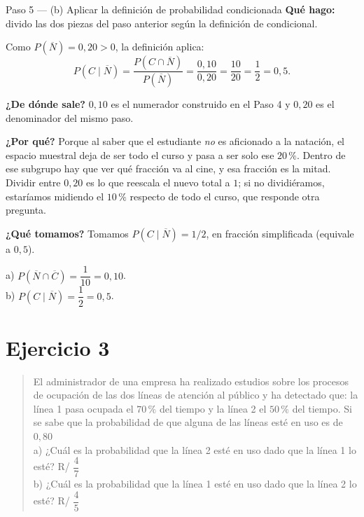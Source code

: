 \documentclass[11pt]{article}
\begin{document}
\begin{paso}{Paso 5 --- (b) Aplicar la definición de probabilidad condicionada}
\textbf{Qué hago:} divido las dos piezas del paso anterior según la definición de condicional.

Como $P(\overline{N})=0{,}20>0$, la definición aplica:
\[
P(C\mid\overline{N})=\frac{P(C\cap\overline{N})}{P(\overline{N})}=\frac{0{,}10}{0{,}20}
=\frac{10}{20}=\frac{1}{2}=0{,}5.
\]

\textbf{¿De dónde sale?} $0{,}10$ es el numerador construido en el Paso 4 y $0{,}20$ es el denominador del mismo paso.

\textbf{¿Por qué?} Porque al saber que el estudiante \emph{no} es aficionado a la natación, el espacio muestral deja de ser todo el curso y pasa a ser solo ese $20\,\%$. Dentro de ese subgrupo hay que ver qué fracción va al cine, y esa fracción es la mitad. Dividir entre $0{,}20$ es lo que reescala el nuevo total a $1$; si no dividiéramos, estaríamos midiendo el $10\,\%$ respecto de todo el curso, que responde otra pregunta.

\textbf{¿Qué tomamos?} Tomamos $P(C\mid\overline{N})=1/2$, en fracción simplificada (equivale a $0{,}5$).
\end{paso}

\begin{resp}
a) $P(\overline{N}\cap\overline{C})=\dfrac{1}{10}=0{,}10$.\\[2pt]
b) $P(C\mid\overline{N})=\dfrac{1}{2}=0{,}5$.
\end{resp}

\section*{Ejercicio 3}

\begin{quote}
El administrador de una empresa ha realizado estudios sobre los procesos de ocupación de las dos líneas de atención al público y ha detectado que: la línea 1 pasa ocupada el $70\,\%$ del tiempo y la línea 2 el $50\,\%$ del tiempo. Si se sabe que la probabilidad de que alguna de las líneas esté en uso es de $0{,}80$\\
a) ¿Cuál es la probabilidad que la línea 2 esté en uso dado que la línea 1 lo esté? \hfill R/ $\dfrac{4}{7}$\\
b) ¿Cuál es la probabilidad que la línea 1 esté en uso dado que la línea 2 lo esté? \hfill R/ $\dfrac{4}{5}$
\end{quote}
\end{document}
